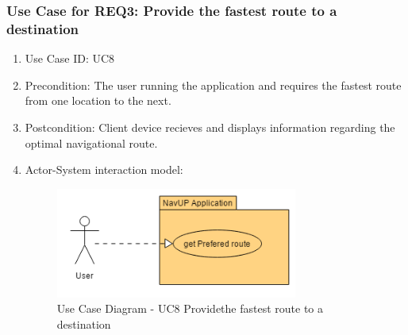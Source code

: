 \documentclass[11pt, a4paper]{article}
\begin{document}
		\subsubsection{Use Case for REQ3: Provide the fastest route to a destination}
			\begin{enumerate}
			\renewcommand{\labelenumi}{{\textbf{\arabic{enumi}.}}}
			\item Use Case ID: UC8
			\item Precondition: The user running the application and requires the fastest route from one location to the next.
			\item Postcondition: Client device recieves and displays information regarding the optimal navigational route.
			\item Actor-System interaction model:
				\graphicspath{ {./Images/User/} }
				\begin{figure}[h]
				\caption{Use Case Diagram - UC8  Providethe fastest route to a destination}
				\includegraphics[width = 300px]{getPreferedRoute.png}
		\end{figure}
			\end{enumerate}
\end{document}
